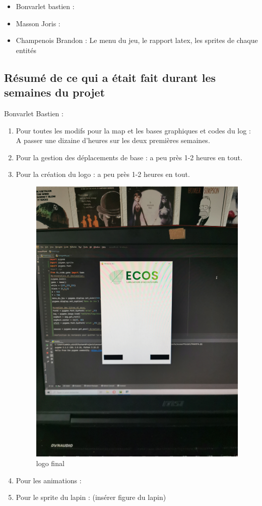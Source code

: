 \documentclass[a4paper, 11pt]{article}
\begin{document}
\begin{itemize}
\item Bonvarlet bastien :\\
\item Masson Joris : \\
\item Champenois Brandon : Le menu du jeu, le rapport latex, les sprites de chaque entités
\end{itemize}

\subsection{Résumé de ce qui a était fait durant les semaines du projet}

Bonvarlet Bastien :\\
\begin{enumerate}
\item Pour toutes les modifs pour la map et les bases graphiques et codes du log : A passer une dizaine d'heures sur les deux premières semaines.\\
\item Pour la gestion des déplacements de base : a peu près 1-2 heures en tout.\\
\item Pour la création du logo : a peu près 1-2 heures en tout.\\
\begin{figure}[ht!]
 \centering
 \includegraphics[width=0.5\linewidth]{images/creation_logo.jpg}
 \caption{logo final}
 \label{fig::example::one}
\end{figure}
\item Pour les animations : \\
\item Pour le sprite du lapin : (insérer figure du lapin)\\
\end{enumerate}
\end{document}
